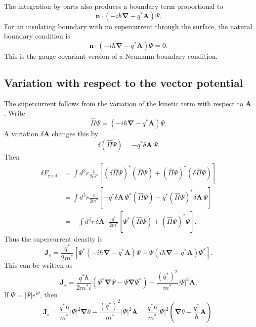 \documentclass[11pt]{article}
\numberwithin{equation}{section}
\newcommand{\Avec}{\bm{A}}
\newcommand{\Jvec}{\bm{J}}
\newcommand{\nvec}{\bm{n}}
\renewcommand{\grad}{\bm{\nabla}}
\newcommand{\Ord}{\Psi}
\begin{document}
The integration by parts also produces a boundary term proportional to
\begin{equation}
\nvec\cdot\left(-i\hbar\grad-q^*\Avec\right)\Ord.
\end{equation}
For an insulating boundary with no supercurrent through the surface, the natural boundary condition is
\begin{equation}
\boxed{\nvec\cdot\left(-i\hbar\grad-q^*\Avec\right)\Ord=0.}
\label{eq:gl_neumann}
\end{equation}
This is the gauge-covariant version of a Neumann boundary condition.

\subsection{Variation with respect to the vector potential}

The supercurrent follows from the variation of the kinetic term with respect to $\Avec$. Write
\begin{equation}
\hat{\Pi}\Ord=(-i\hbar\grad-q^*\Avec)\Ord.
\end{equation}
A variation $\delta\Avec$ changes this by
\begin{equation}
\delta(\hat{\Pi}\Ord)=-q^*\delta\Avec\,\Ord.
\end{equation}
Then
\begin{align}
\delta F_{\mathrm{grad}}&=\int d^3r\frac{1}{2m^*}\left[(\delta\hat{\Pi}\Ord)^*(\hat{\Pi}\Ord)+(\hat{\Pi}\Ord)^*(\delta\hat{\Pi}\Ord)\right]\\
&=\int d^3r\frac{1}{2m^*}\left[-q^*\delta\Avec\,\Ord^*(\hat{\Pi}\Ord)-q^* (\hat{\Pi}\Ord)^*\delta\Avec\,\Ord\right]\\
&=-\int d^3r\,\delta\Avec\cdot\frac{q^*}{2m^*}\left[\Ord^*(\hat{\Pi}\Ord)+(\hat{\Pi}\Ord)^*\Ord\right].
\end{align}
Thus the supercurrent density is
\begin{equation}
\boxed{\Jvec_s=\frac{q^*}{2m^*}\left[\Ord^*(-i\hbar\grad-q^*\Avec)\Ord+\Ord(i\hbar\grad-q^*\Avec)\Ord^*\right].}
\label{eq:gl_current_general}
\end{equation}
This can be written as
\begin{equation}
\boxed{\Jvec_s=\frac{q^*\hbar}{2m^*i}\left(\Ord^*\grad\Ord-\Ord\grad\Ord^*\right)-\frac{(q^*)^2}{m^*}|\Ord|^2\Avec.}
\label{eq:gl_current}
\end{equation}
If $\Ord=|\Ord|e^{i\theta}$, then
\begin{equation}
\Jvec_s=\frac{q^*\hbar}{m^*}|\Ord|^2\grad\theta-\frac{(q^*)^2}{m^*}|\Ord|^2\Avec
=\frac{q^*\hbar}{m^*}|\Ord|^2\left(\grad\theta-\frac{q^*}{\hbar}\Avec\right).
\end{equation}
\end{document}
